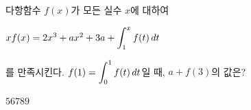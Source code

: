 다항함수 $f(x)$가 모든 실수 $x$에 대하여 \par\smallskip\noindent\hspace*{1.5em}$xf(x)=2x^3+ax^2+3a+\displaystyle\int_{1}^{x}f(t)\mkern3mu dt$\par\smallskip\noindent 를 만족시킨다. $f(1)=\displaystyle\int_{0}^{1}f(t)\mkern3mu dt$일 때, $a+f(3)$의 값은? 
\begin{choices32}{$5$}{$6$}{$7$}{$8$}{$9$}\end{choices32}

